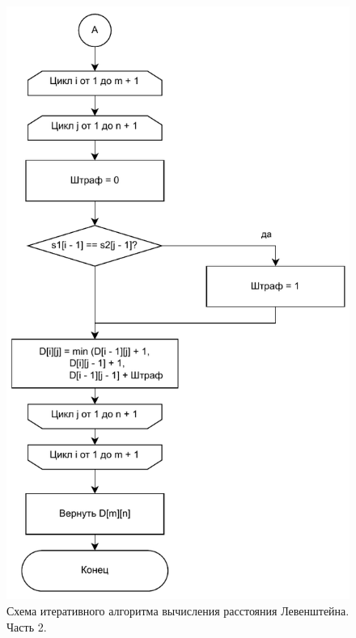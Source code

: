 \begin{figure}[H]
    \centering
    \includegraphics[width=130mm]{images/l_iterative_part2}
    \caption{Схема итеративного алгоритма вычисления расстояния Левенштейна. Часть 2.}
    \label{images:l_iterative_part2}
\end{figure}

